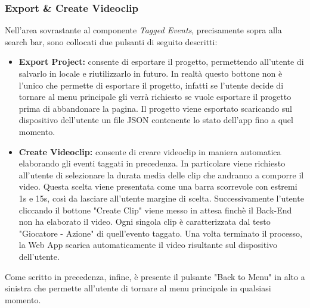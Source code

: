 \subsubsection{Export \& Create Videoclip}

Nell'area sovrastante al componente \textit{Tagged Events}, precisamente sopra alla search bar, sono collocati due pulsanti di seguito descritti:
\begin{itemize}
    \item \textbf{Export Project:} consente di esportare il progetto, permettendo all'utente di salvarlo in locale e riutilizzarlo in futuro. In realtà questo bottone non è l'unico che permette di esportare il progetto, infatti se l'utente decide di tornare al menu principale gli verrà richiesto se vuole esportare il progetto prima di abbandonare la pagina. Il progetto viene esportato scaricando sul dispositivo dell'utente un file JSON contenente lo stato dell'app fino a quel momento.
    \item \textbf{Create Videoclip:} consente di creare videoclip in maniera automatica elaborando gli eventi taggati in precedenza. In particolare viene richiesto all'utente di selezionare la durata media delle clip che andranno a comporre il video. Questa scelta viene presentata come una barra scorrevole con estremi 1s e 15s, così da lasciare all'utente margine di scelta. Successivamente l'utente cliccando il bottone "Create Clip" viene messo in attesa finchè il Back-End non ha elaborato il video. Ogni singola clip è caratterizzata dal testo "Giocatore - Azione" di quell'evento taggato. Una volta terminato il processo, la Web App scarica automaticamente il video risultante sul dispositivo dell'utente.
\end{itemize}

\noindent Come scritto in precedenza, infine, è presente il pulsante "Back to Menu" in alto a sinistra che permette all'utente di tornare al menu principale in qualsiasi momento.
\pagebreak
\clearpage


